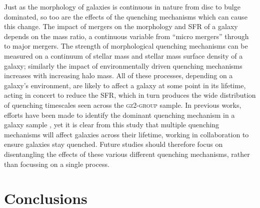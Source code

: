 \documentclass[useAMS,usenatbib]{mn2e}
\begin{document}
Just as the morphology of galaxies is continuous in nature from disc to bulge dominated, so too are the effects of the quenching mechanisms which can cause this change. The impact of mergers on the morphology and SFR of a galaxy depends on the mass ratio, a continuous variable from ``micro mergers'' \citep{carlin16} through to major mergers. The strength of morphological quenching mechanisms can be measured on a continuum of stellar mass and stellar mass surface density of a galaxy; similarly the impact of environmentally driven quenching mechanisms increases with increasing halo mass. All of these processes, depending on a galaxy's environment, are likely to affect a galaxy at some point in its lifetime, acting in concert to reduce the SFR, which in turn produces the wide distribution of quenching timescales seen across the \textsc{gz2-group} sample. In previous works, efforts have been made to identify the dominant quenching mechanism in a galaxy sample \citep[e.g.][]{muzzin12, schawinski14, foltz15, woo15, balogh16, darvish16, huertascompany16}, yet it is clear from this study that multiple quenching mechanisms will affect galaxies across their lifetime, working in collaboration to ensure galaxies stay quenched. Future studies should therefore focus on disentangling the effects of these various different quenching mechanisms, rather than focussing on a single process. 

\section{Conclusions}\label{sec:conc}
\end{document}
